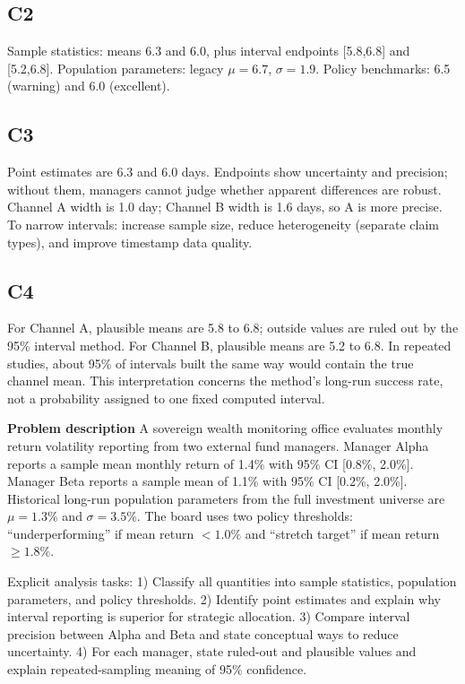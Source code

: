 \begin{ExamProblems}
		\subsection*{C2}
		Sample statistics: means 6.3 and 6.0, plus interval endpoints [5.8,6.8] and [5.2,6.8].
		Population parameters: legacy $\mu=6.7$, $\sigma=1.9$.
		Policy benchmarks: 6.5 (warning) and 6.0 (excellent).
		
		\subsection*{C3}
		Point estimates are 6.3 and 6.0 days.
		Endpoints show uncertainty and precision; without them, managers cannot judge whether apparent differences are robust.
		Channel A width is 1.0 day; Channel B width is 1.6 days, so A is more precise.
		To narrow intervals: increase sample size, reduce heterogeneity (separate claim types), and improve timestamp data quality.
		
		\subsection*{C4}
		For Channel A, plausible means are 5.8 to 6.8; outside values are ruled out by the 95\% interval method.
		For Channel B, plausible means are 5.2 to 6.8.
		In repeated studies, about 95\% of intervals built the same way would contain the true channel mean.
		This interpretation concerns the method's long-run success rate, not a probability assigned to one fixed computed interval.


		
		\newpage
		\item
		\textbf{Problem description}
		A sovereign wealth monitoring office evaluates monthly return volatility reporting from two external fund managers.
		Manager Alpha reports a sample mean monthly return of 1.4\% with 95\% CI [0.8\%, 2.0\%].
		Manager Beta reports a sample mean of 1.1\% with 95\% CI [0.2\%, 2.0\%].
		Historical long-run population parameters from the full investment universe are $\mu=1.3\%$ and $\sigma=3.5\%$.
		The board uses two policy thresholds: ``underperforming'' if mean return $<1.0\%$ and ``stretch target'' if mean return $\ge 1.8\%$.
		
		Explicit analysis tasks:
		1) Classify all quantities into sample statistics, population parameters, and policy thresholds.
		2) Identify point estimates and explain why interval reporting is superior for strategic allocation.
		3) Compare interval precision between Alpha and Beta and state conceptual ways to reduce uncertainty.
		4) For each manager, state ruled-out and plausible values and explain repeated-sampling meaning of 95\% confidence.
		

\end{ExamProblems}
